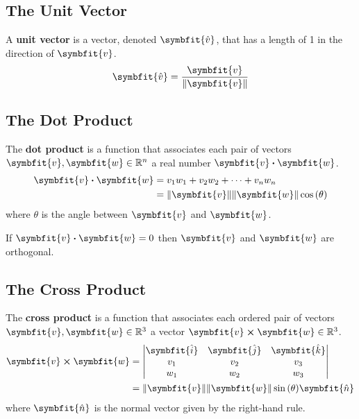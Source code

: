 \documentclass{article}
\begin{document}
	\subsection{The Unit Vector}
		\begin{definition}
			A \textbf{unit vector} is a vector, denoted $\symbfit{\hat{v}}$, that has a length of 1 in the direction of $\symbfit{v}$.
			\begin{equation*}
				\symbfit{\hat{v}} = \frac{\symbfit{v}}{\norm{\symbfit{v}}}
			\end{equation*}
		\end{definition}
	\subsection{The Dot Product}
		\begin{definition}
			The \textbf{dot product} is a function that associates each pair of vectors $\symbfit{v},\symbfit{w} \in \mathbb{R}^n$ a real number $\symbfit{v}\vdot\symbfit{w}$.
			\begin{align*}
				\symbfit{v}\vdot\symbfit{w} &= v_1 w_1 + v_2 w_2 + \cdots + v_n w_n \\
									&= \norm{\symbfit{v}} \norm{\symbfit{w}} \cos{\left(\theta\right)}
			\end{align*}
			where $\theta$ is the angle between $\symbfit{v}$ and $\symbfit{w}$.
		\end{definition}
		\begin{theorem}
			If $\symbfit{v} \vdot \symbfit{w}=0$ then $\symbfit{v}$ and $\symbfit{w}$ are orthogonal. 
		\end{theorem} 
	\subsection{The Cross Product}
		\begin{definition}
			The \textbf{cross product} is a function that associates each ordered pair of vectors $\symbfit{v},\symbfit{w}\in \mathbb{R}^3$ a vector $\symbfit{v}\cross\symbfit{w}\in \mathbb{R}^3$.
			\begin{align*}
				\symbfit{v}\cross\symbfit{w} &= 
				\mqty|
					\symbfit{\hat{i}} & \symbfit{\hat{j}} & \symbfit{\hat{k}} \\
					v_1 & v_2 & v_3 \\
					w_1 & w_2 & w_3
				| \\
				&= \norm{\symbfit{v}}\norm{\symbfit{w}}\sin{\left(\theta\right)}\symbfit{\hat{n}}
			\end{align*}
			where $\symbfit{\hat{n}}$ is the normal vector given by the right-hand rule.
		\end{definition}
	\newpage
\end{document}
